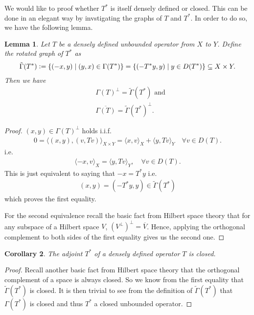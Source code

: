 \documentclass[12pt,a4paper]{article}
\numberwithin{equation}{subsection}
\newtheorem{lemma}{Lemma}[section]
\numberwithin{lemma}{subsection}
\newtheorem{corollary}[lemma]{Corollary}
\theoremstyle{definition}
\begin{document}
We would like to proof whether $T^*$ is itself densely defined or closed. 
This can be done in an elegant way by invstigating the graphs of $T$ and 
$T^*$. In order to do so, we have the following lemma.
\begin{lemma}\label{lem:rotated_graph}
    Let $T$ be a densely defined unbounded operator from $X$ to $Y$. 
    Define the rotated graph of $T^*$ as
    \begin{align*}
        \tilde{\Gamma}(T^*) \vcentcolon= \{ (-x,y) \mid (y,x) \in \Gamma(T^*) \}
        = \{ (-T^*y, y) \mid y \in D(T^*) \} \subseteq X \times Y.
    \end{align*}
    Then we have 
    \begin{align*}
        & \Gamma(T)^\perp = \tilde{\Gamma}(T^*) \text{ and}
        \\ &\overline{\Gamma(T)} = \tilde{\Gamma}(T^*)^\perp.
    \end{align*}
\end{lemma}
\begin{proof}
    $(x,y) \in \Gamma(T)^\perp$ holds i.i.f. 
    \begin{align*}
        0 = \langle (x,y), (v,Tv) \rangle _{X\times Y}
        = \langle x, v \rangle _X + \langle y, Tv \rangle _Y
            \quad \forall v \in D(T).
    \end{align*}
    i.e. 
    \begin{align*}
        \langle -x, v \rangle _X = \langle y, Tv \rangle _Y,
            \quad \forall v \in D(T).
    \end{align*}
    This is just equivalent to saying that $-x = T^*y$ i.e.
    \begin{align*}
        (x,y) = (-T^*y,y) \in \tilde{\Gamma}(T^*)
    \end{align*}
    which proves the first equality.

    For the second equivalence recall the basic fact from Hilbert space theory
    that for any subspace of a Hilbert space $V$,
    $(V^\perp)^\perp = \overline{V}$. Hence, applying the orthogonal 
    complement to both sides of the first equality gives us the second one.
\end{proof}

\begin{corollary}\label{cor:adjoint_of_densely_defined}
    The adjoint $T^*$ of a densely defined operator $T$ is closed. 
\end{corollary}
\begin{proof}
    Recall another basic fact from Hilbert space theory that the 
    orthogonal complement of a space is always closed. 
    So we know from the first equality that $\tilde{\Gamma}(T^*)$ is closed.
    It is then trivial to see from the definition of $\tilde{\Gamma}(T^*)$
    that $\Gamma(T^*)$ is closed and 
    thus $T^*$ a closed unbounded operator.
\end{proof}
\end{document}
